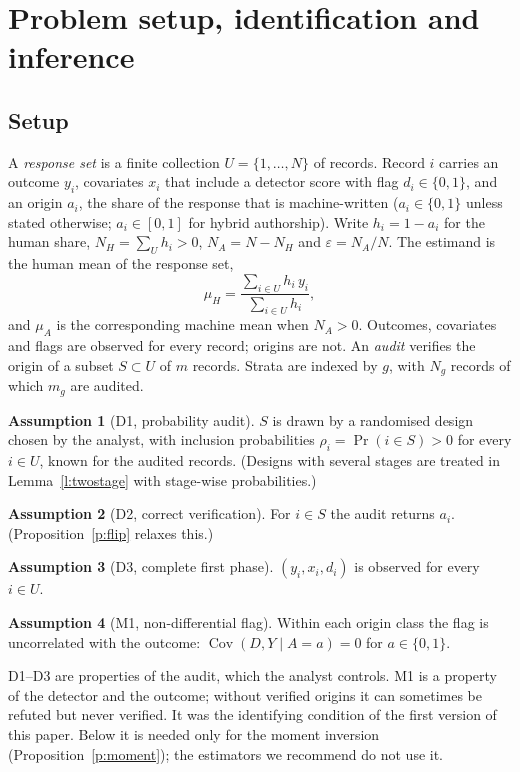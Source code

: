 \documentclass[11pt]{article}
\theoremstyle{definition}
\newtheorem{assumption}{Assumption}
\newcommand{\Cov}{\operatorname{Cov}}
\newcommand{\muH}{\mu_H}
\begin{document}

\section{Problem setup, identification and inference}\label{sec:theory}

\subsection{Setup}
A \emph{response set} is a finite collection $U=\{1,\dots,N\}$ of records. Record $i$
carries an outcome $y_i$, covariates $x_i$ that include a detector score with flag
$d_i\in\{0,1\}$, and an origin $a_i$, the share of the response that is machine-written
($a_i\in\{0,1\}$ unless stated otherwise; $a_i\in[0,1]$ for hybrid authorship). Write
$h_i=1-a_i$ for the human share, $N_H=\sum_U h_i>0$, $N_A=N-N_H$ and $\varepsilon=N_A/N$.
The estimand is the human mean of the response set,
\begin{equation}\label{eq:estimand}
\muH=\frac{\sum_{i\in U}h_i\,y_i}{\sum_{i\in U}h_i},
\end{equation}
and $\mu_A$ is the corresponding machine mean when $N_A>0$. Outcomes, covariates and flags
are observed for every record; origins are not. An \emph{audit} verifies the origin of a
subset $S\subset U$ of $m$ records. Strata are indexed by $g$, with $N_g$ records of which
$m_g$ are audited.

\begin{assumption}[D1, probability audit]\label{a:d1}
$S$ is drawn by a randomised design chosen by the analyst, with inclusion probabilities
$\rho_i=\Pr(i\in S)>0$ for every $i\in U$, known for the audited records. (Designs with
several stages are treated in Lemma~\ref{l:twostage} with stage-wise probabilities.)
\end{assumption}
\begin{assumption}[D2, correct verification]\label{a:d2}
For $i\in S$ the audit returns $a_i$. (Proposition~\ref{p:flip} relaxes this.)
\end{assumption}
\begin{assumption}[D3, complete first phase]\label{a:d3}
$(y_i,x_i,d_i)$ is observed for every $i\in U$.
\end{assumption}
\begin{assumption}[M1, non-differential flag]\label{a:m1}
Within each origin class the flag is uncorrelated with the outcome:
$\Cov(D,Y\mid A=a)=0$ for $a\in\{0,1\}$.
\end{assumption}
D1--D3 are properties of the audit, which the analyst controls. M1 is a property of the
detector and the outcome; without verified origins it can sometimes be refuted but never
verified. It was the identifying condition of the first version of this paper. Below it
is needed only for the moment inversion (Proposition~\ref{p:moment}); the estimators we
recommend do not use it.
\end{document}
